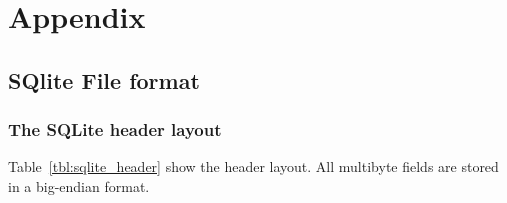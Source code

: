 \section{Appendix}
\label{sec:appendix}

\subsection{SQlite File format}
\label{subsec:append_sqltie_file_format}

\subsubsection{The SQLite header layout}
\label{subsub:header_layout}
Table~\ref{tbl:sqlite_header} show the header layout.  All multibyte fields are stored in a big-endian format.

